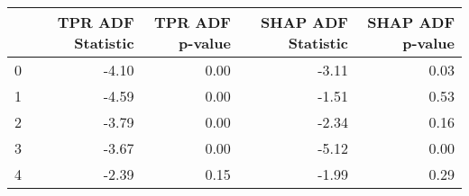 \begin{tabular}{lrrrr}
\toprule
 & TPR ADF Statistic & TPR ADF p-value & SHAP ADF Statistic & SHAP ADF p-value \\
\midrule
0 & -4.10 & 0.00 & -3.11 & 0.03 \\
1 & -4.59 & 0.00 & -1.51 & 0.53 \\
2 & -3.79 & 0.00 & -2.34 & 0.16 \\
3 & -3.67 & 0.00 & -5.12 & 0.00 \\
4 & -2.39 & 0.15 & -1.99 & 0.29 \\
\bottomrule
\end{tabular}
